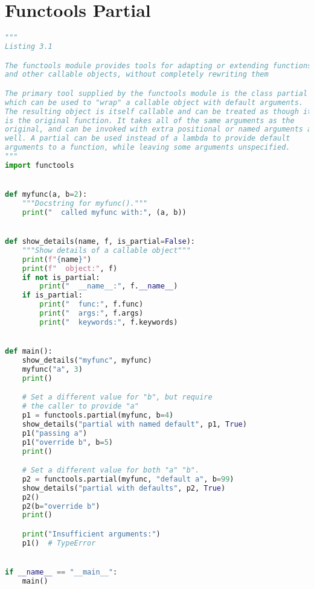 \documentclass[a4paper,landscape]{report}
\begin{document}
\section{Functools Partial}
\begin{lstlisting}[language=Python]
"""
Listing 3.1

The functools module provides tools for adapting or extending functions
and other callable objects, without completely rewriting them

The primary tool supplied by the functools module is the class partial
which can be used to "wrap" a callable object with default arguments.
The resulting object is itself callable and can be treated as though it
is the original function. It takes all of the same arguments as the
original, and can be invoked with extra positional or named arguments as
well. A partial can be used instead of a lambda to provide default
arguments to a function, while leaving some arguments unspecified.
"""
import functools


def myfunc(a, b=2):
    """Docstring for myfunc()."""
    print("  called myfunc with:", (a, b))


def show_details(name, f, is_partial=False):
    """Show details of a callable object"""
    print(f"{name}")
    print(f"  object:", f)
    if not is_partial:
        print("  __name__:", f.__name__)
    if is_partial:
        print("  func:", f.func)
        print("  args:", f.args)
        print("  keywords:", f.keywords)


def main():
    show_details("myfunc", myfunc)
    myfunc("a", 3)
    print()

    # Set a different value for "b", but require
    # the caller to provide "a"
    p1 = functools.partial(myfunc, b=4)
    show_details("partial with named default", p1, True)
    p1("passing a")
    p1("override b", b=5)
    print()

    # Set a different value for both "a" "b".
    p2 = functools.partial(myfunc, "default a", b=99)
    show_details("partial with defaults", p2, True)
    p2()
    p2(b="override b")
    print()

    print("Insufficient arguments:")
    p1()  # TypeError


if __name__ == "__main__":
    main()

\end{lstlisting}
\end{document}
